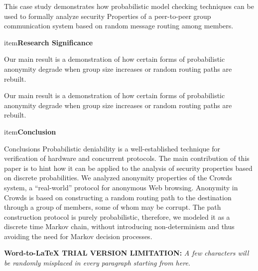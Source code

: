 \documentclass[10pt]{article}
\begin{document}
	{\raggedright
{\large This case study demonstrates how probabilistic model checking techniques can be used to formally analyze security
Properties of a peer-to-peer group communication system based on random message routing among members.
 }
}
\begin{enumerate}
	item\textbf{{\large Research Significance}}
		{\raggedright
	{\large Our main result is a demonstration of how certain forms of probabilistic anonymity degrade when group size increases or random routing paths are rebuilt.}
}
\end {enumerate}
Our main result is a demonstration of how certain forms of probabilistic anonymity degrade when group size increases or random routing paths are rebuilt.
\begin{enumerate}
	item\textbf{{\large Conclusion}}
\end {enumerate}
{\raggedright
{\large Conclusions
Probabilistic deniability is a well-established technique for verification of hardware and concurrent protocols. The main contribution of this paper is to hint how it can be applied to the analysis of security properties based on discrete probabilities. We analyzed anonymity properties of the Crowds system, a “real-world” protocol for anonymous Web browsing. Anonymity in Crowds is based on constructing a random routing path to the destination through a group of members, some of whom may be corrupt. The path construction protocol is purely probabilistic, therefore, we modeled it as a discrete time Markov chain, without introducing non-determinism and thus avoiding the need for Markov decision processes.
}
}
{\large  }
\textbf{Word-to-LaTeX TRIAL VERSION LIMITATION:}\textit{ A few characters will be randomly misplaced in every paragraph starting from here.}
\end{document}
